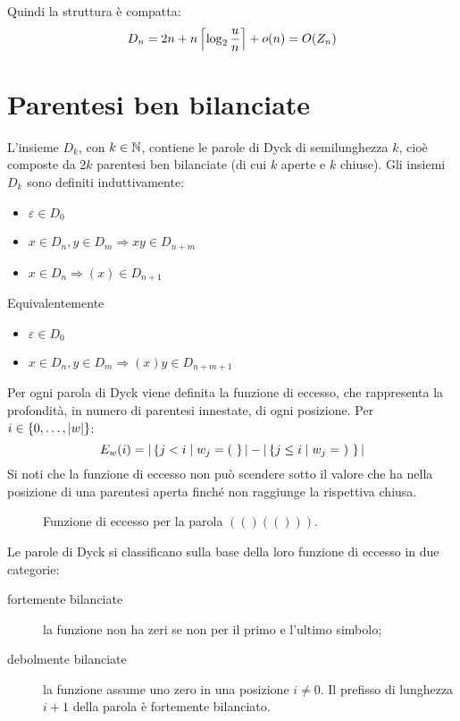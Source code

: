 Quindi la struttura è compatta:
\begin{equation*}
	D_n = 2n+n\left\lceil \log_2\frac un \right\rceil+o(n) = O(Z_n)
\end{equation*}



\section{Parentesi ben bilanciate}
L'insieme $D_k$, con $k\in\mathbb N$, contiene le parole di Dyck di semilunghezza $k$, cioè composte da $2k$ parentesi ben bilanciate (di cui $k$ aperte e $k$ chiuse). Gli insiemi $D_k$ sono definiti induttivamente:
\begin{itemize}
	\item $\varepsilon\in D_0$
	\item $x\in D_n,y\in D_m\Rightarrow xy\in D_{n+m}$
	\item $x\in D_n\Rightarrow (x)\in D_{n+1}$
\end{itemize}
Equivalentemente
\begin{itemize}
	\item $\varepsilon\in D_0$
	\item $x\in D_n,y\in D_m\Rightarrow (x)y\in D_{n+m+1}$
\end{itemize}

Per ogni parola di Dyck viene definita la funzione di eccesso, che rappresenta la profondità, in numero di parentesi innestate, di ogni posizione. Per $i\in\left\{ 0,\dots,|w| \right\}$:
\begin{equation*}
	E_w(i) = | \left\{ j < i \mid w_j = (~  \right\} | - | \left\{ j\leq i \mid w_j =~)~  \right\} |
\end{equation*}
Si noti che la funzione di eccesso non può scendere sotto il valore che ha nella posizione di una parentesi aperta finché non raggiunge la rispettiva chiusa.

\begin{figure}[ht]
	\centering
	
	\caption{Funzione di eccesso per la parola $(()(()))$.}
	\label{fig:func_excess}
\end{figure}

Le parole di Dyck si classificano sulla base della loro funzione di eccesso in due categorie:
\begin{description}
	\item[fortemente bilanciate] la funzione non ha zeri se non per il primo e l'ultimo simbolo;
	\item[debolmente bilanciate] la funzione assume uno zero in una posizione $i\neq0$. Il prefisso di lunghezza $i+1$ della parola è fortemente bilanciato.
\end{description}

